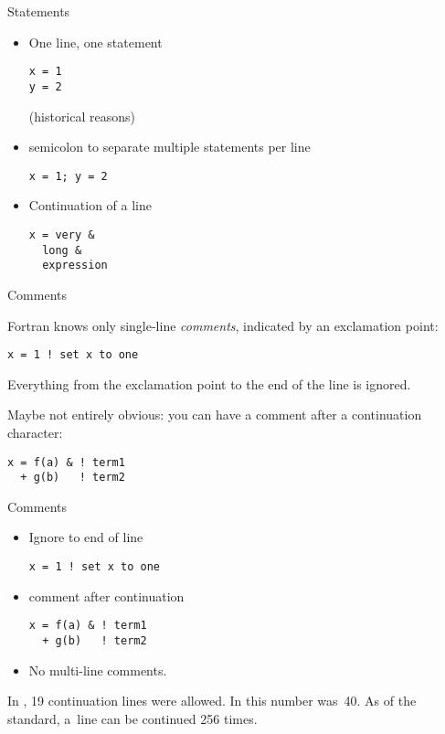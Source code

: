 \begin{slide}{Statements}
  \label{sl:fstatement}
  \begin{itemize}
  \item One line, one statement
\begin{lstlisting}
x = 1
y = 2
\end{lstlisting}
(historical reasons)
\item semicolon to separate multiple statements per line
\begin{lstlisting}
x = 1; y = 2
\end{lstlisting}
\item Continuation of a line
\begin{lstlisting}
x = very &
  long &
  expression
\end{lstlisting}
  \end{itemize}
\end{slide}

 {Comments}

Fortran knows only single-line
\emph{comments},
indicated by an exclamation point:
\begin{lstlisting}
x = 1 ! set x to one
\end{lstlisting}
Everything from the exclamation point to the end of the line is ignored.

Maybe not entirely obvious: you can have a comment after a
continuation character:
\begin{lstlisting}
x = f(a) & ! term1 
  + g(b)   ! term2
\end{lstlisting}

\begin{slide}{Comments}
  \label{sl:fcomment}
  \begin{itemize}
  \item Ignore to end of line
\begin{lstlisting}
x = 1 ! set x to one
\end{lstlisting}
\item comment after continuation
\begin{lstlisting}
x = f(a) & ! term1 
  + g(b)   ! term2
\end{lstlisting}
  \item No multi-line comments.
  \end{itemize}
\end{slide}

\begin{remark}
  In , 19 continuation lines were allowed.
  In  this number was~40.
  As of the  standard, a~line can be continued 256 times.
\end{remark}

